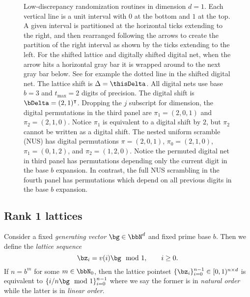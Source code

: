 \documentclass[acmsmall]{acmart}
\begin{document}
\begin{figure}
    \caption{Low-discrepancy randomization routines in dimension $d=1$. Each vertical line is a unit interval with $0$ at the bottom and $1$ at the top. A given interval is partitioned at the horizontal ticks extending to the right, and then rearranged following the arrows to create the partition of the right interval as shown by the ticks extending to the left. For the shifted lattice and digitally shifted digital net, when the arrow hits a horizontal gray bar it is wrapped around to the next gray bar below. See for example the dotted line in the shifted digital net. The lattice shift is $\Delta = \thisDelta$. All digital nets use base $b=3$ and $t_\mathrm{max}=2$ digits of precision. The digital shift is $\bDelta = (2,1)^\intercal$. Dropping the $j$ subscript for dimension, the digital permutations in the third panel are $\pi_1 = (2,0,1)$ and $\pi_2 = (2,1,0)$. Notice $\pi_1$ is equivalent to a digital shift by $2$, but $\pi_2$ cannot be written as a digital shift. The nested uniform scramble (NUS) has digital permutations $\pi = (2,0,1)$, $\pi_0 = (2,1,0)$, $\pi_1 = (0,1,2)$, and $\pi_2 = (1,2,0)$. Notice the permuted digital net in third panel has permutations depending only the current digit in the base $b$ expansion. In contrast, the full NUS scrambling in the fourth panel has permutations which depend on all previous digits in the base $b$ expansion.}
    \label{fig:ld_randomizations}
\end{figure}  

\subsection{Rank 1 lattices}

Consider a fixed \emph{generating vector} $\bg \in \bbN^d$ and fixed prime base $b$. Then we define the \emph{lattice sequence} 
$$\bz_i = v(i) \bg \mod 1, \qquad i \geq 0.$$
If $n=b^m$ for some $m \in \bbN_0$, then the lattice pointset $\{\bz_i\}_{i=0}^{n-1}\in [0,1)^{n \times d}$ is equivalent to $\{i/n \bg \mod 1\}_{i=0}^{n-1}$ where we say the former is in \emph{natural order} while the latter is in \emph{linear order}. 
\end{document}
